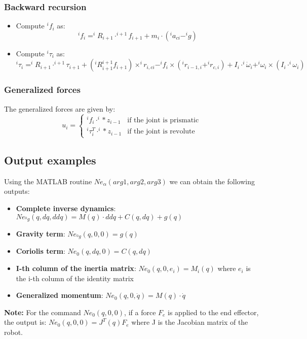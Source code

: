 \documentclass[a4paper,12pt]{article}
\begin{document}
\subsubsection{Backward recursion}
\begin{itemize}
    \item Compute $^i f_i$ as: \begin{equation}
        ^i f_i = ^iR_{i+1} \cdot ^{i+1}f_{i+1} + m_i \cdot (^i a_{ci} - ^ig)
    \end{equation}
    \item Compute $^i \tau_i$ as: \begin{equation}
        ^i \tau_i = ^iR_{i+1} \cdot ^{i+1}\tau_{i+1} + (^iR_{i+1}^{i+1}f_{i+1}) \times ^ir_{i,ci} -^if_i \times (^ir_{i-1,i}+^ir_{c,i})+I_i \cdot ^i\dot{\omega}_i + ^i\omega_i \times (I_i \cdot ^i\omega_i)
    \end{equation}
\end{itemize}
\subsubsection{Generalized forces}
The generalized forces are given by:
\begin{equation}
    u_i = \begin{cases}
        ^if_i\cdot ^i*z_{i-1} & \text{if the joint is prismatic} \\
        ^i\tau_i^T\cdot ^i*z_{i-1} & \text{if the joint is revolute}
    \end{cases}
\end{equation}
\subsection{Output examples}
Using the MATLAB routine $Ne_\alpha(arg1,arg2,arg3)$ we can obtain 
the following outputs:
\begin{itemize}
    \item \textbf{Complete inverse dynamics}: $Ne_{^0g}(q,dq,ddq)= M(q) \cdot ddq + C(q,dq) + g(q)$
    \item \textbf{Gravity term}: $Ne_{^0g}(q,0,0) = g(q)$
    \item \textbf{Coriolis term}: $Ne_{0}(q,dq,0) = C(q,dq)$
    \item \textbf{I-th column of the inertia matrix}: $Ne_{0}(q,0,e_i) = M_i(q)$ where $e_i$
     is the i-th column of the identity matrix
    \item \textbf{Generalized momentum}: $Ne_{0}(q,0,\dot{q}) = M(q) \cdot \dot{q}$
\end{itemize}
\textbf{Note:} For the command $Ne_{0}(q,0,0)$, if a force $F_e$
is applied to the end effector, the output is: $Ne_{0}(q,0,0) = J^T(q)F_e$
where J is the Jacobian matrix of the robot.
\end{document}
